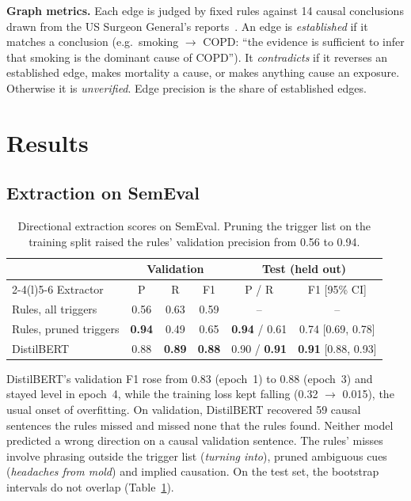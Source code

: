 \documentclass[11pt,a4paper]{article}
\begin{document}
\textbf{Graph metrics.} Each edge is judged by fixed rules against 14 causal conclusions drawn from the US Surgeon General's
reports~\citep{sgr2014,sgr2010}. An edge is \emph{established} if it matches a conclusion (e.g.\ smoking $\rightarrow$ COPD: ``the evidence
is sufficient to infer that smoking is the dominant cause of COPD''). It \emph{contradicts} if it reverses an established edge, makes
mortality a cause, or makes anything cause an exposure. Otherwise it is \emph{unverified}. Edge precision is the share of established edges.

\section{Results}

\subsection{Extraction on SemEval}

\begin{table}[H]
\centering\small
\begin{tabular}{@{}lccccc@{}}
\toprule
 & \multicolumn{3}{c}{Validation} & \multicolumn{2}{c}{Test (held out)} \\
\cmidrule(lr){2-4}\cmidrule(l){5-6}
Extractor & P & R & F1 & P / R & F1 [95\% CI] \\
\midrule
Rules, all triggers & 0.56 & 0.63 & 0.59 & -- & -- \\
Rules, pruned triggers & \textbf{0.94} & 0.49 & 0.65 & \textbf{0.94} / 0.61 & 0.74 [0.69, 0.78] \\
DistilBERT & 0.88 & \textbf{0.89} & \textbf{0.88} & 0.90 / \textbf{0.91} & \textbf{0.91} [0.88, 0.93] \\
\bottomrule
\end{tabular}
\caption{Directional extraction scores on SemEval. Pruning the trigger list on the training split raised the rules' validation
precision from 0.56 to 0.94.}
\label{tab:semeval}
\end{table}

DistilBERT's validation F1 rose from 0.83 (epoch~1) to 0.88 (epoch~3) and stayed level in epoch~4, while the training loss kept
falling (0.32 $\rightarrow$ 0.015), the usual onset of overfitting. On validation, DistilBERT recovered 59 causal sentences the rules
missed and missed none that the rules found. Neither model predicted a wrong direction on a causal validation sentence. The rules'
misses involve phrasing outside the trigger list (\textit{turning into}), pruned ambiguous cues (\textit{headaches from mold}) and
implied causation. On the test set, the bootstrap intervals do not overlap (Table~\ref{tab:semeval}).
\end{document}

